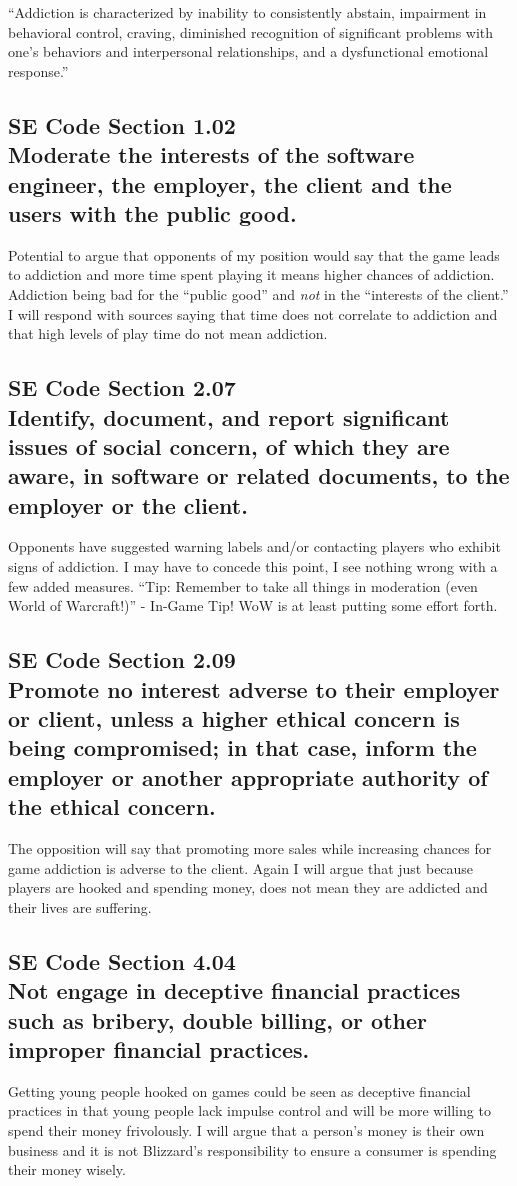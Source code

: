 \documentclass[11pt]{article}
\begin{document}
\begin{multicols}{2}
``Addiction is characterized by inability to consistently abstain, impairment in behavioral control, craving, diminished recognition of significant problems with one’s behaviors and interpersonal relationships, and a dysfunctional emotional response.'' \cite{DefinitionOfAddiction}

\subsection{SE Code Section 1.02\\Moderate the interests of the software engineer, the employer, the client and the users with the public good.}
Potential to argue that opponents of my position would say that the game leads to addiction and more time spent playing it means higher chances of addiction. Addiction being bad for the ``public good'' and \emph{not} in the ``interests of the client.'' I will respond with sources saying that time does not correlate to addiction and that high levels of play time do not mean addiction.
\subsection{SE Code Section 2.07\\Identify, document, and report significant issues of social concern, of which they are aware, in software or related documents, to the employer or the client.}
Opponents have suggested warning labels and/or contacting players who exhibit signs of addiction. I may have to concede this point, I see nothing wrong with a few added measures.
``Tip: Remember to take all things in moderation (even World of Warcraft!)'' - In-Game Tip! WoW is at least putting some effort forth.
\subsection{SE Code Section 2.09\\Promote no interest adverse to their employer or client, unless a higher ethical concern is being compromised; in that case, inform the employer or another appropriate authority of the ethical concern.}
The opposition will say that promoting more sales while increasing chances for game addiction is adverse to the client. Again I will argue that just because players are hooked and spending money, does not mean they are addicted and their lives are suffering.
\subsection{SE Code Section 4.04\\Not engage in deceptive financial practices such as bribery, double billing, or other improper financial practices.}
Getting young people hooked on games could be seen as deceptive financial practices in that young people lack impulse control and will be more willing to spend their money frivolously. I will argue that a person's money is their own business and it is not Blizzard's responsibility to ensure a consumer is spending their money wisely.

\end{multicols}
\newpage

\nocite{*}




\end{document}
